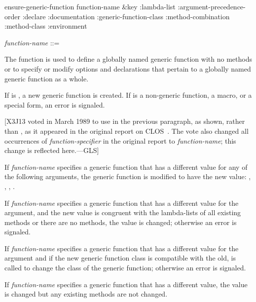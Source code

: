 \begin{defun}[Function]
ensure-generic-function function-name &key :lambda-list
:argument-precedence-order
:declare
:documentation
:generic-function-class
:method-combination
:method-class
:environment

\begin{tabbing}
{\it function-name\/} ::= 
\end{tabbing}
The function  is used to define a
globally named generic function with no methods or to specify or
modify options and declarations that pertain to a globally named
generic function as a whole.

If  is , a new
generic function is created.  If  is a non-generic function, a macro, or a
special form, an error is signaled.

[X3J13 voted in March 1989  to use 
in the previous paragraph, as shown, rather than ,
as it appeared in the original report on CLOS~\cite{SIGPLAN-CLOS,LASC-CLOS-PART-2}.
The vote also changed all occurrences of {\it function-specifier} in the
original report to {\it function-name}; this change is reflected here.---GLS]

If {\it function-name\/} specifies a generic function that has a
different value for any of the following arguments, the generic
function is modified to have the new value: 
, , ,
.

If {\it function-name\/} specifies a generic function that has a
different value for the  argument, and the new value
is congruent with the lambda-lists of all existing methods or there
are no methods, the value is changed; otherwise an error is signaled.

If {\it function-name\/} specifies a generic function that has a
different value for the  argument and if
the new generic function class is compatible with the old, 
 is called to change the class of the generic function;
otherwise an error is signaled.

If {\it function-name\/} specifies a generic function that has a
different  value, the value is
changed but any existing methods are not changed.





\end{defun}
